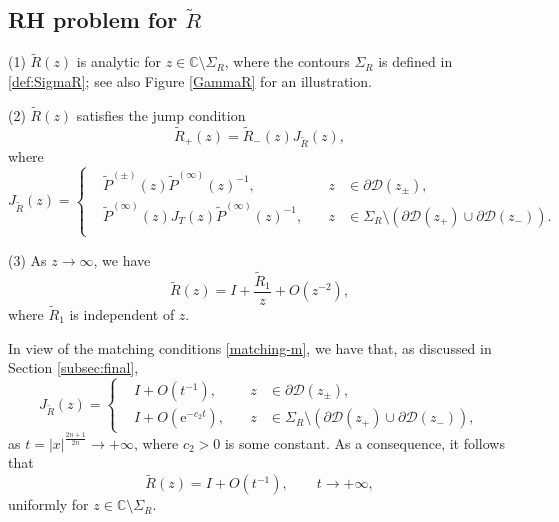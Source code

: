 \documentclass[11pt,a4paper]{article}
\numberwithin{equation}{section}
\begin{document}
\subsection*{RH problem for $\widetilde{R}$}
\begin{description}
\item{(1)} $\widetilde{R}(z)$ is analytic for $z\in \mathbb{C}\setminus\Sigma_{R}$, where the contours $\Sigma_{R}$ is defined in \eqref{def:SigmaR}; see also Figure \ref{GammaR} for an illustration.
\item{(2)} $\widetilde{R}(z)$ satisfies the jump condition $$\widetilde{R}_+(z)=\widetilde{R}_-(z)J_{\widetilde{R}}(z),$$
  where
 \begin{equation}\label{Jump-tilde-R}
 J_{\widetilde{R}}(z)=\left\{\begin{aligned}
&\widetilde{P}^{(\pm)}(z)\widetilde{P}^{(\infty)}(z)^{-1},\quad &z&\in \partial\mathcal{D}(z_{\pm}),\\
&\widetilde{P}^{(\infty)}(z)J_{T}(z)\widetilde{P}^{(\infty)}(z)^{-1},\quad &z& \in \Sigma_R\setminus (\partial \mathcal{D}(z_+) \cup \partial \mathcal{D}(z_-)).\\ \end{aligned}
\right.
 \end{equation}
\item{(3)} As $z\rightarrow\infty$, we have
\begin{equation}\label{Rexpan}
\widetilde{R}(z)=I+\frac{\widetilde{R}_1}{z}+O\left(z^{-2}\right),
\end{equation}
where $\widetilde R_1$ is independent of $z$.
\end{description}

In view of the matching conditions \eqref{matching-m}, we have that, as discussed in Section \ref{subsec:final},
\begin{equation}\label{JRestimation-m}
J_{\widetilde{R}}(z)=\left\{\begin{aligned}
&I+O\left(t^{-1}\right), \quad &z&\in\partial \mathcal{D}(z_{\pm}),\\
&I+O\left(\mathrm{e}^{-c_2t}\right), \quad &z& \in \Sigma_R\setminus (\partial \mathcal{D}(z_+) \cup \partial \mathcal{D}(z_-)),
\end{aligned}\right.
\end{equation}
as $t=|x|^{\frac{2n+1}{2n}}\to +\infty$, where $c_2>0$ is some constant. As a consequence, it follows that
\begin{equation}\label{Rtilde-estimation}
\widetilde{R}(z)=I+O\left(t^{-1}\right),\qquad  t \to +\infty,
\end{equation}
uniformly for $z\in \mathbb{C}\setminus\Sigma_{R}$.
\end{document}
